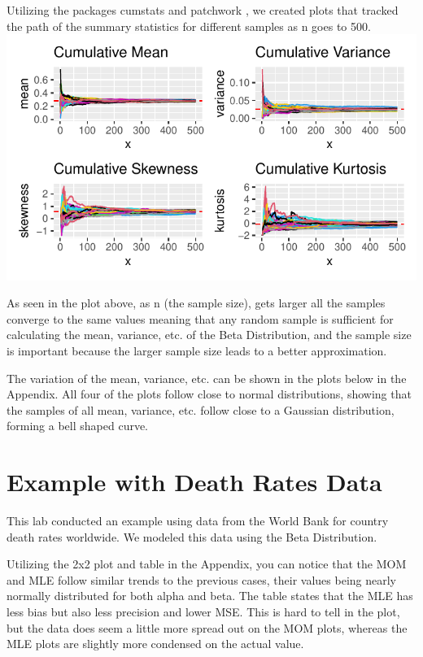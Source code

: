 \documentclass{article}\usepackage[]{graphicx}\usepackage[]{xcolor}
\makeatletter
\def\maxwidth{ %
  \ifdim\Gin@nat@width>\linewidth
    \linewidth
  \else
    \Gin@nat@width
  \fi
}
\newenvironment{knitrout}{}{} %
\makeatother
\begin{document}
\begin{multicols}{2}
Utilizing the packages cumstats \citep{cumstats} and patchwork \citep{patchwork}, we created plots that tracked the path of the summary statistics for different samples as n goes to 500.
\begin{knitrout}
\color{fgcolor}
\includegraphics[width=\maxwidth]{figure/unnamed-chunk-5-1} 
\end{knitrout}

As seen in the plot above, as n (the sample size), gets larger all the samples converge to the same values meaning that any random sample is sufficient for calculating the mean, variance, etc.  of the Beta Distribution, and the sample size is important because the larger sample size leads to a better approximation.

The variation of the mean, variance, etc. can be shown in the plots below in the Appendix.
All four of the plots follow close to normal distributions, showing that the samples of all mean, variance, etc. follow close to a Gaussian distribution, forming a bell shaped curve.

\section{Example with Death Rates Data}
This lab conducted an example using data from the World Bank for country death rates worldwide. We modeled this data using the Beta Distribution. 

Utilizing the 2x2 plot and table in the Appendix, you can notice that the MOM and MLE follow similar trends to the previous cases, their values being nearly normally distributed for both alpha and beta. The table states that the MLE has less bias but also less precision and lower MSE. This is hard to tell in the plot, but the data does seem a little more spread out on the MOM plots, whereas the MLE plots are slightly more condensed on the actual value.

\begin{tiny}

\end{tiny}
\end{multicols}
\end{document}
